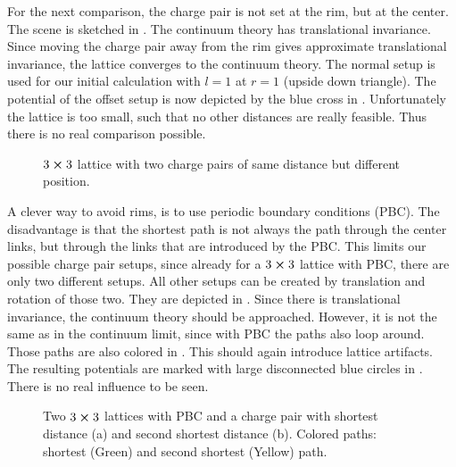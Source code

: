 For the next comparison, the charge pair is not set at the rim, but at the center. The scene is sketched in . The continuum theory has translational invariance. Since moving the charge pair away from the rim gives approximate translational invariance, the lattice converges to the continuum theory. The normal setup is used for our initial calculation with $l=1$ at $r=1$ (upside down triangle). The potential of the offset setup is now depicted by the blue cross in . Unfortunately the lattice is too small, such that no other distances are really feasible. Thus there is no real comparison possible.
\begin{figure}[h]
	\begin{center}
		
		\caption{$3\cross 3$ lattice with two charge pairs of same distance but different position.}\label{fig:3x3no}
	\end{center}
\end{figure}

A clever way to avoid rims, is to use periodic boundary conditions (PBC). The disadvantage is that the shortest path is not always the path through the center links, but through the links that are introduced by the PBC. This limits our possible charge pair setups, since already for a $3 \cross 3$ lattice with PBC, there are only two different setups. All other setups can be created by translation and rotation of those two. They are depicted in .
Since there is translational invariance, the continuum theory should be approached. However, it is not the same as in the continuum limit, since with PBC the paths also loop around. Those paths are also colored in . This should again introduce lattice artifacts.
The resulting potentials are marked with large disconnected blue circles in . There is no real influence to be seen.
\begin{figure}[h]
	\begin{center}
		\subfloat[]{
			\scalebox{0.7}{
				
			}
		}
		\subfloat[]{
			\scalebox{0.7}{
				
			}
		}
		\caption{Two $3\cross3$ lattices with PBC and a charge pair with shortest distance (a) and second shortest distance (b). Colored paths: shortest (Green) and second shortest (Yellow) path.} \label{fig:3x3pbcv1}
	\end{center}
\end{figure}

